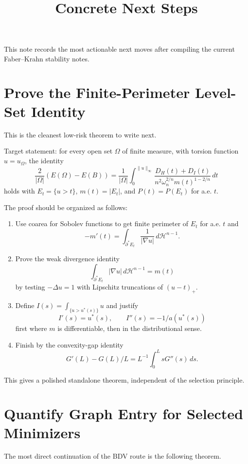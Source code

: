 \documentclass[11pt]{article}
\title{Concrete Next Steps}
\author{}
\date{}
\begin{document}
\maketitle

This note records the most actionable next moves after compiling the current
Faber--Krahn stability notes.

\section{Prove the Finite-Perimeter Level-Set Identity}

This is the cleanest low-risk theorem to write next.

Target statement: for every open set \(\Omega\) of finite measure, with torsion
function \(u=u_\Omega\), the identity
\[
\frac{2}{|\Omega|}(E(\Omega)-E(B))
=
\frac1{|\Omega|}
\int_0^{\|u\|_\infty}
\frac{D_H(t)+D_I(t)}
{n^2\omega_n^{2/n}m(t)^{1-2/n}}\,dt
\]
holds with \(E_t=\{u>t\}\), \(m(t)=|E_t|\), and \(P(t)=P(E_t)\) for a.e. \(t\).

The proof should be organized as follows:
\begin{enumerate}
\item Use coarea for Sobolev functions to get finite perimeter of \(E_t\) for
a.e. \(t\) and
\[
-m'(t)=\int_{\partial^*E_t}\frac1{|\nabla u|}\,d\mathcal H^{n-1}.
\]
\item Prove the weak divergence identity
\[
\int_{\partial^*E_t}|\nabla u|\,d\mathcal H^{n-1}=m(t)
\]
by testing \(-\Delta u=1\) with Lipschitz truncations of \((u-t)_+\).
\item Define \(I(s)=\int_{\{u>u^*(s)\}}u\) and justify
\[
I'(s)=u^*(s),\qquad I''(s)=-1/a(u^*(s))
\]
first where \(m\) is differentiable, then in the distributional sense.
\item Finish by the convexity-gap identity
\[
G'(L)-G(L)/L=L^{-1}\int_0^L sG''(s)\,ds.
\]
\end{enumerate}
This gives a polished standalone theorem, independent of the selection
principle.

\section{Quantify Graph Entry for Selected Minimizers}

The most direct continuation of the BDV route is the following theorem.
\end{document}
